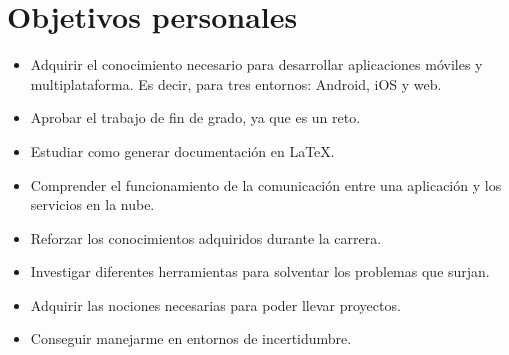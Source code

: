 \section{Objetivos personales}
\begin{itemize}
	\item Adquirir el conocimiento necesario para desarrollar aplicaciones móviles y multiplataforma. Es decir, para tres entornos: Android, iOS y web.
	\item Aprobar el trabajo de fin de grado, ya que es un reto.
	\item Estudiar como generar documentación en \LaTeX.
	\item Comprender el funcionamiento de la comunicación entre una aplicación y los servicios en la nube.
	\item Reforzar los conocimientos adquiridos durante la carrera.
	\item Investigar diferentes herramientas para solventar los problemas que surjan.
	\item Adquirir las nociones necesarias para poder llevar proyectos.
	\item Conseguir manejarme en entornos de incertidumbre.
\end{itemize}